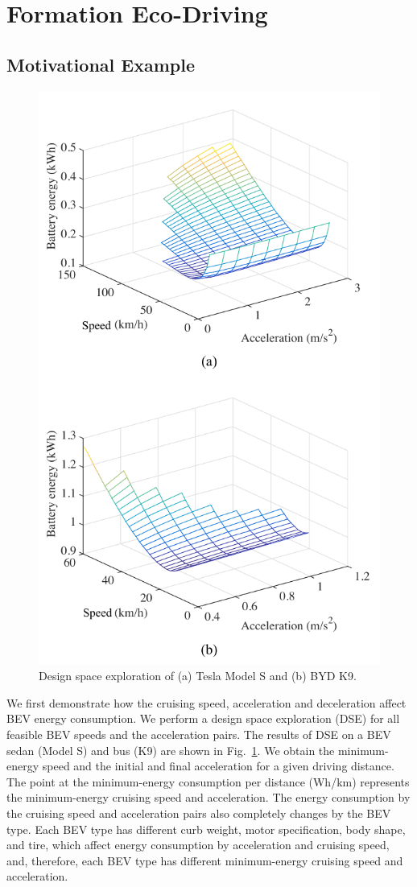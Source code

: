 \documentclass{IEEEtran}
\begin{document}
\section{Formation Eco-Driving}\label{sec:problem}

\subsection{Motivational Example}

\begin{figure}	%
\centering
\includegraphics[width=0.8\hsize]{Figures/DSE.pdf}
\caption{Design space exploration of (a) Tesla Model S and (b) BYD K9.}
\label{fig:DSE}
\end{figure} 


We first demonstrate how the cruising speed, acceleration and deceleration affect BEV energy consumption. We perform a design space exploration (DSE) for all feasible BEV speeds and the acceleration pairs. The results of DSE on a BEV sedan (Model S) and bus (K9) are shown in Fig.~\ref{fig:DSE}. 
We obtain the minimum-energy speed and the initial and final acceleration for a given driving distance. 
The point at the minimum-energy consumption per distance (Wh/km) represents the minimum-energy cruising speed and acceleration. The energy consumption by the cruising speed and acceleration pairs also completely changes by the BEV type. 
Each BEV type has different curb weight, motor specification, body shape, and tire, which affect energy consumption by acceleration and cruising speed, and, therefore, each BEV type has different minimum-energy cruising speed and acceleration.
\end{document}
